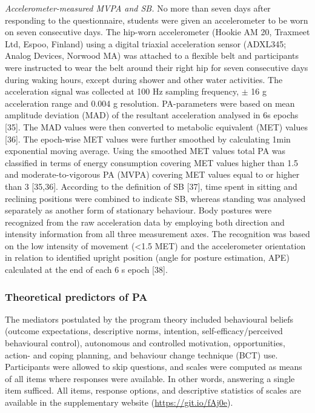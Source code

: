 \documentclass[english,man,floatsintext]{apa6}
\begin{document}
\emph{Accelerometer-measured MVPA and SB.} No more than seven days after responding to the questionnaire, students were given an accelerometer to be worn on seven consecutive days. The hip-worn accelerometer (Hookie AM 20, Traxmeet Ltd, Espoo, Finland) using a digital triaxial acceleration sensor (ADXL345; Analog Devices, Norwood MA) was attached to a flexible belt and participants were instructed to wear the belt around their right hip for seven consecutive days during waking hours, except during shower and other water activities. The acceleration signal was collected at 100 Hz sampling frequency, \(\pm\) 16 g acceleration range and 0.004 g resolution. PA-parameters were based on mean amplitude deviation (MAD) of the resultant acceleration analysed in 6s epochs {[}35{]}. The MAD values were then converted to metabolic equivalent (MET) values {[}36{]}. The epoch-wise MET values were further smoothed by calculating 1min exponential moving average. Using the smoothed MET values total PA was classified in terms of energy consumption covering MET values higher than 1.5 and moderate-to-vigorous PA (MVPA) covering MET values equal to or higher than 3 {[}35,36{]}. According to the definition of SB {[}37{]}, time spent in sitting and reclining positions were combined to indicate SB, whereas standing was analysed separately as another form of stationary behaviour. Body postures were recognized from the raw acceleration data by employing both direction and intensity information from all three measurement axes. The recognition was based on the low intensity of movement (\textless{}1.5 MET) and the accelerometer orientation in relation to identified upright position (angle for posture estimation, APE) calculated at the end of each 6 s epoch {[}38{]}.

\hypertarget{theoretical-predictors-of-pa}{%
\subsubsection{Theoretical predictors of PA}\label{theoretical-predictors-of-pa}}

The mediators postulated by the program theory included behavioural beliefs (outcome expectations, descriptive norms, intention, self-efficacy/perceived behavioural control), autonomous and controlled motivation, opportunities, action- and coping planning, and behaviour change technique (BCT) use. Participants were allowed to skip questions, and scales were computed as means of all items where responses were available. In other words, answering a single item sufficed. All items, response options, and descriptive statistics of scales are available in the supplementary website (\url{https://git.io/fAj0e}).
\end{document}
